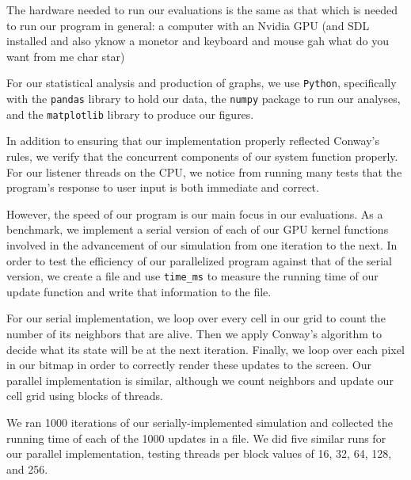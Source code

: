 \documentclass[12pt]{article}
\begin{document}
    The hardware needed to run our evaluations is the same as that which is needed to run our program in general: a computer with an Nvidia GPU (and SDL installed and also yknow a monetor and keyboard and mouse gah what do you want from me char star)
    
    For our statistical analysis and production of graphs, we use \texttt{Python}, specifically with the \texttt{pandas} library to hold our data, the \texttt{numpy} package to run our analyses, and the \texttt{matplotlib} library to produce our figures.  

    In addition to ensuring that our implementation properly reflected Conway's rules, we verify that the concurrent components of our system function properly. For our listener threads on the CPU, we notice from running many tests that the program's response to user input is both immediate and correct. 
    
    However, the speed of our program is our main focus in our evaluations. As a benchmark, we implement a serial version of each of our GPU kernel functions involved in the advancement of our simulation from one iteration to the next. In order to test the efficiency of our parallelized program against that of the serial version, we create a file and use \texttt{time\_ms} to measure the running time of our update function and write that information to the file. 
    
    For our serial implementation, we loop over every cell in our grid to count the number of its neighbors that are alive. Then we apply Conway's algorithm to decide what its state will be at the next iteration. Finally, we loop over each pixel in our bitmap in order to correctly render these updates to the screen. Our parallel implementation is similar, although we count neighbors and update our cell grid using blocks of threads. 

    We ran 1000 iterations of our serially-implemented simulation and collected the running time of each of the 1000 updates in a file. We did five similar runs for our parallel implementation, testing threads per block values of 16, 32, 64, 128, and 256.
\end{document}
